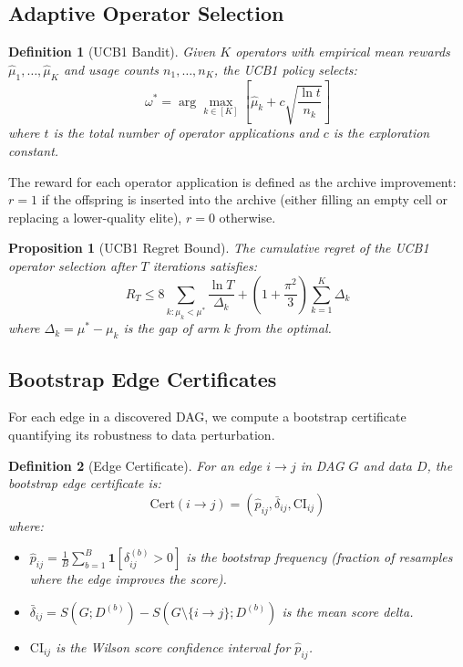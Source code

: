 \documentclass[11pt,a4paper]{article}
\newtheorem{proposition}[theorem]{Proposition}
\newtheorem{definition}{Definition}
\begin{document}
\subsection{Adaptive Operator Selection}

\begin{definition}[UCB1 Bandit]
Given $K$ operators with empirical mean rewards $\hat{\mu}_1, \ldots, \hat{\mu}_K$ and usage counts $n_1, \ldots, n_K$, the UCB1 policy selects:
\begin{equation}
    \omega^* = \arg\max_{k \in [K]} \left[ \hat{\mu}_k + c \sqrt{\frac{\ln t}{n_k}} \right]
\end{equation}
where $t$ is the total number of operator applications and $c$ is the exploration constant.
\end{definition}

The reward for each operator application is defined as the archive improvement: $r = 1$ if the offspring is inserted into the archive (either filling an empty cell or replacing a lower-quality elite), $r = 0$ otherwise.

\begin{proposition}[UCB1 Regret Bound]
\label{prop:ucb1}
The cumulative regret of the UCB1 operator selection after $T$ iterations satisfies:
\begin{equation}
    R_T \leq 8 \sum_{k : \mu_k < \mu^*} \frac{\ln T}{\Delta_k} + (1 + \frac{\pi^2}{3}) \sum_{k=1}^{K} \Delta_k
\end{equation}
where $\Delta_k = \mu^* - \mu_k$ is the gap of arm $k$ from the optimal.
\end{proposition}

\subsection{Bootstrap Edge Certificates}
\label{sec:certificates}

For each edge in a discovered DAG, we compute a bootstrap certificate quantifying its robustness to data perturbation.

\begin{definition}[Edge Certificate]
For an edge $i \to j$ in DAG $G$ and data $D$, the \emph{bootstrap edge certificate} is:
\begin{equation}
    \text{Cert}(i \to j) = \left( \hat{p}_{ij}, \bar{\delta}_{ij}, \text{CI}_{ij} \right)
\end{equation}
where:
\begin{itemize}[leftmargin=*]
    \item $\hat{p}_{ij} = \frac{1}{B} \sum_{b=1}^{B} \mathbf{1}[\delta_{ij}^{(b)} > 0]$ is the bootstrap frequency (fraction of resamples where the edge improves the score).
    \item $\bar{\delta}_{ij} = S(G; D^{(b)}) - S(G \setminus \{i \to j\}; D^{(b)})$ is the mean score delta.
    \item $\text{CI}_{ij}$ is the Wilson score confidence interval for $\hat{p}_{ij}$.
\end{itemize}
\end{definition}
\end{document}
